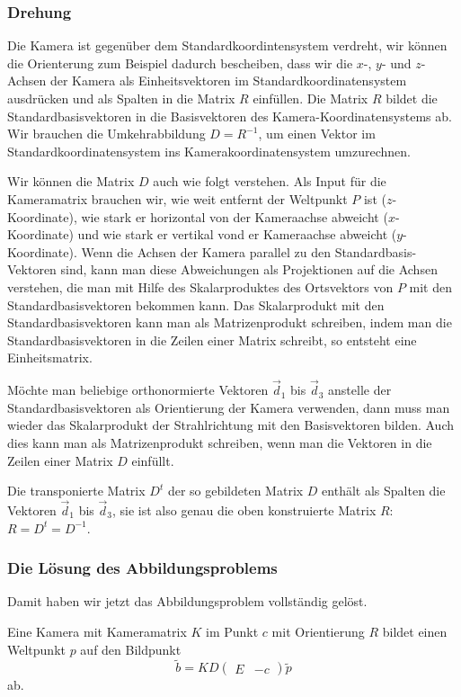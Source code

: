 \subsubsection{Drehung}
Die Kamera ist gegenüber dem Standardkoordintensystem verdreht,
wir können die Orienterung zum Beispiel dadurch bescheiben, dass wir
die $x$-, $y$- und $z$-Achsen der Kamera als Einheitsvektoren im
Standardkoordinatensystem ausdrücken und als Spalten in die Matrix $R$
einfüllen.
Die Matrix $R$ bildet die Standardbasisvektoren in die Basisvektoren
des Kamera-Koordinatensystems ab.
Wir brauchen die Umkehrabbildung $D=R^{-1}$, um einen Vektor im
Standardkoordinatensystem ins Kamerakoordinatensystem umzurechnen.

Wir können die Matrix $D$ auch wie folgt verstehen.
Als Input für die Kameramatrix brauchen wir, wie weit entfernt der Weltpunkt
$P$
ist ($z$-Koordinate), wie stark er horizontal von der Kameraachse abweicht
($x$-Koordinate) und wie stark er vertikal vond er Kameraachse abweicht
($y$-Koordinate).
Wenn die Achsen der Kamera parallel zu den Standardbasis-Vektoren sind,
kann man diese Abweichungen als Projektionen auf die Achsen verstehen,
die man mit Hilfe des Skalarproduktes des Ortsvektors von $P$ mit den
Standardbasisvektoren bekommen kann.
Das Skalarprodukt mit den Standardbasisvektoren kann man als Matrizenprodukt
schreiben, indem man die Standardbasisvektoren in die Zeilen einer Matrix
schreibt, so entsteht eine Einheitsmatrix.

Möchte man beliebige orthonormierte Vektoren $\vec{d}_1$ bis $\vec{d}_3$
anstelle der Standardbasisvektoren als Orientierung der Kamera verwenden,
dann muss man wieder das
Skalarprodukt der Strahlrichtung mit den Basisvektoren bilden.
Auch dies kann man als Matrizenprodukt schreiben, wenn man die Vektoren
in die Zeilen einer Matrix $D$ einfüllt.

Die transponierte Matrix $D^t$ der so gebildeten Matrix $D$ enthält als
Spalten die Vektoren $\vec{d}_1$ bis $\vec{d}_3$, sie ist also genau
die oben konstruierte Matrix $R$: $R=D^t=D^{-1}$.

\subsubsection{Die Lösung des Abbildungsproblems}
Damit haben wir jetzt das Abbildungsproblem vollständig gelöst.

\begin{satz}
Eine Kamera mit Kameramatrix $K$ im Punkt $c$ mit Orientierung $R$ bildet
einen Weltpunkt $p$ auf den Bildpunkt
\[
\tilde b
=
K D \begin{pmatrix} E&-c\end{pmatrix} \tilde p
\]
ab.
\end{satz}

